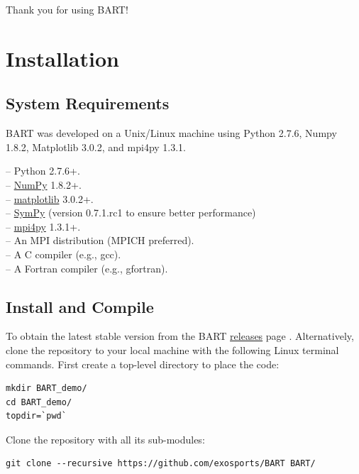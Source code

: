 \documentclass[letterpaper, 12pt]{article}
\begin{document}
\noindent
Thank you for using BART! \newline

\section{Installation}
\label{sec:installation}

\subsection{System Requirements}
\label{sec:requirements}

BART was developed on a Unix/Linux machine using Python 2.7.6, Numpy
1.8.2, Matplotlib 3.0.2, and mpi4py 1.3.1.

\noindent -- Python 2.7.6+. \\
\noindent -- \href{http://www.numpy.org/}{NumPy} 1.8.2+. \\
\noindent -- \href{http://matplotlib.org/index.html}{matplotlib} 3.0.2+. \\
\noindent -- \href{https://github.com/sympy/sympy/releases/tag/sympy/0.7.1.rc1}
                  {SymPy} (version 0.7.1.rc1 to ensure better performance) \\
\noindent -- \href{http://mpi4py.scipy.org/docs/usrman/install.html}
                  {mpi4py} 1.3.1+. \\
\noindent -- An MPI distribution (MPICH preferred). \\
\noindent -- A C compiler (e.g., gcc). \\
\noindent -- A Fortran compiler (e.g., gfortran). \\

\subsection{Install and Compile}
\label{sec:install}

To obtain the latest stable version from the BART
\href{https://github.com/exosports/BART/releases}{releases} page
.  Alternatively, clone the repository to your local
machine with the following Linux terminal commands. 
First create a top-level directory to place the code:
\begin{verbatim}
mkdir BART_demo/
cd BART_demo/
topdir=`pwd`
\end{verbatim}
\newline

\noindent Clone the repository with all its sub-modules:
\begin{verbatim}
git clone --recursive https://github.com/exosports/BART BART/
\end{verbatim}
\end{document}
